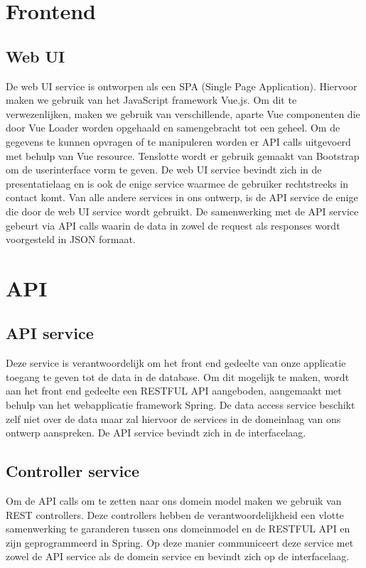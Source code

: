 \documentclass[11pt,openany]{article}
\begin{document}
	\section{Frontend}
	\subsection{Web UI}
	De web UI service is ontworpen als een SPA (Single Page Application). Hiervoor maken we gebruik van het JavaScript framework Vue.js. Om dit te verwezenlijken, maken we gebruik van verschillende, aparte Vue componenten die door Vue Loader worden opgehaald en samengebracht tot een geheel. Om de gegevens te kunnen opvragen of te manipuleren worden er API calls uitgevoerd met behulp van Vue resource. Tenslotte wordt er gebruik gemaakt van Bootstrap om de userinterface vorm te geven. De web UI service bevindt zich in de presentatielaag en is ook de enige service waarmee de gebruiker rechtstreeks in contact komt. Van alle andere services in ons ontwerp, is de API service de enige die door de web UI service wordt gebruikt. De samenwerking met de API service gebeurt via API calls waarin de data in zowel de request als responses wordt voorgesteld in JSON formaat.
	\section{API}
	\subsection{API service}
	Deze service is verantwoordelijk om het front end gedeelte van onze applicatie toegang te geven tot de data in de database. Om dit mogelijk te maken, wordt aan het front end gedeelte een RESTFUL API aangeboden, aangemaakt met behulp van het webapplicatie framework Spring. De data access service beschikt zelf niet over de data maar zal hiervoor de services in de domeinlaag van ons ontwerp aanspreken. De API service bevindt zich in de interfacelaag. 
	\subsection{Controller service}
	Om de API calls om te zetten naar ons domein model maken we gebruik van REST controllers. Deze controllers hebben de verantwoordelijkheid een vlotte samenwerking te garanderen tussen ons domeinmodel en de RESTFUL API en zijn geprogrammeerd in Spring. Op deze manier communiceert deze service met zowel de API service als de domein service en bevindt zich op de interfacelaag.
	\newpage
\end{document}
